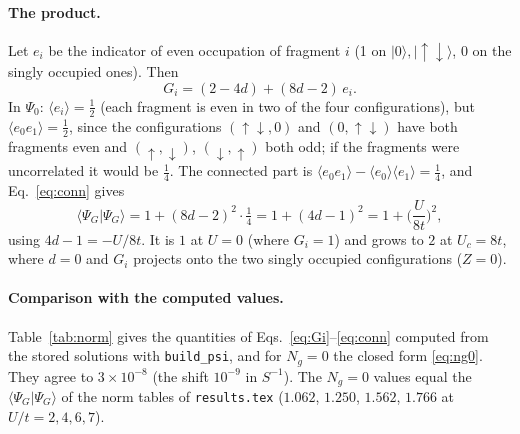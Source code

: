 \documentclass[11pt]{article}
\newcommand{\Ng}{N_g}
\begin{document}
\paragraph{The product.} Let $e_i$ be the indicator of even occupation of fragment $i$ (1 on $|0\rangle,|\!\uparrow\downarrow\rangle$, 0 on the singly occupied ones). Then
\begin{equation}
G_i=(2-4d)+(8d-2)\,e_i .
\end{equation}
In $\Psi_0$: $\langle e_i\rangle=\tfrac12$ (each fragment is even in two of the four configurations), but $\langle e_0e_1\rangle=\tfrac12$, since the configurations $(\uparrow\downarrow,0)$ and $(0,\uparrow\downarrow)$ have both fragments even and $(\uparrow,\downarrow)$, $(\downarrow,\uparrow)$ both odd; if the fragments were uncorrelated it would be $\tfrac14$. The connected part is $\langle e_0e_1\rangle-\langle e_0\rangle\langle e_1\rangle=\tfrac14$, and Eq.~\eqref{eq:conn} gives
\begin{equation}
\langle\Psi_G|\Psi_G\rangle=1+(8d-2)^2\cdot\tfrac14=1+(4d-1)^2=1+\Big(\frac{U}{8t}\Big)^{2},
\label{eq:ng0}
\end{equation}
using $4d-1=-U/8t$. It is $1$ at $U=0$ (where $G_i=1$) and grows to $2$ at $U_c=8t$, where $d=0$ and $G_i$ projects onto the two singly occupied configurations ($Z=0$).

\paragraph{Comparison with the computed values.} Table~\ref{tab:norm} gives the quantities of Eqs.~\eqref{eq:Gi}--\eqref{eq:conn} computed from the stored solutions with \texttt{build\_psi}, and for $\Ng=0$ the closed form \eqref{eq:ng0}. They agree to $3\times10^{-8}$ (the shift $10^{-9}$ in $S^{-1}$). The $\Ng=0$ values equal the $\langle\Psi_G|\Psi_G\rangle$ of the norm tables of \texttt{results.tex} ($1.062$, $1.250$, $1.562$, $1.766$ at $U/t=2,4,6,7$).
\end{document}

